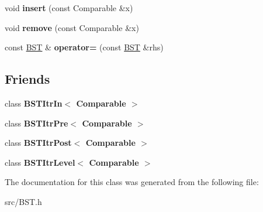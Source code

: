 \begin{DoxyCompactItemize}
\item 
\hypertarget{class_b_s_t_a2b117df6521c7d61dac75ff2c938bae7}{}void {\bfseries insert} (const Comparable \&x)\label{class_b_s_t_a2b117df6521c7d61dac75ff2c938bae7}

\item 
\hypertarget{class_b_s_t_a6f01a0b44daf82a42022b6eb4c0df7a2}{}void {\bfseries remove} (const Comparable \&x)\label{class_b_s_t_a6f01a0b44daf82a42022b6eb4c0df7a2}

\item 
\hypertarget{class_b_s_t_aa80c39f454c89d4a202be3d1445823f3}{}const \hyperlink{class_b_s_t}{B\+S\+T} \& {\bfseries operator=} (const \hyperlink{class_b_s_t}{B\+S\+T} \&rhs)\label{class_b_s_t_aa80c39f454c89d4a202be3d1445823f3}

\end{DoxyCompactItemize}
\subsection*{Friends}
\begin{DoxyCompactItemize}
\item 
\hypertarget{class_b_s_t_aab3993acac2ab24a0b59edb0c3acc775}{}class {\bfseries B\+S\+T\+Itr\+In$<$ Comparable $>$}\label{class_b_s_t_aab3993acac2ab24a0b59edb0c3acc775}

\item 
\hypertarget{class_b_s_t_a45a55df6f11541416d4ea7684c575c1a}{}class {\bfseries B\+S\+T\+Itr\+Pre$<$ Comparable $>$}\label{class_b_s_t_a45a55df6f11541416d4ea7684c575c1a}

\item 
\hypertarget{class_b_s_t_a5dc153694be266f6e772659486219da7}{}class {\bfseries B\+S\+T\+Itr\+Post$<$ Comparable $>$}\label{class_b_s_t_a5dc153694be266f6e772659486219da7}

\item 
\hypertarget{class_b_s_t_a26ff00bc0d87069aed877f10fd3c80a8}{}class {\bfseries B\+S\+T\+Itr\+Level$<$ Comparable $>$}\label{class_b_s_t_a26ff00bc0d87069aed877f10fd3c80a8}

\end{DoxyCompactItemize}


The documentation for this class was generated from the following file\+:\begin{DoxyCompactItemize}
\item 
src/B\+S\+T.\+h\end{DoxyCompactItemize}
